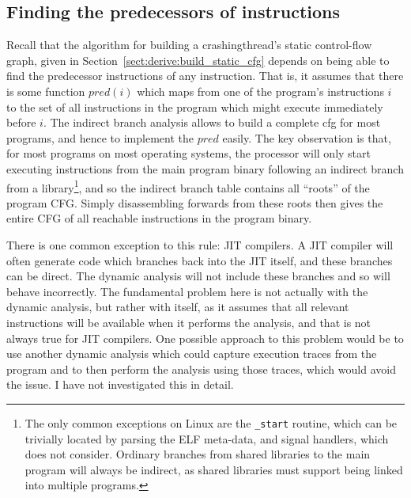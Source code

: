 \subsection{Finding the predecessors of instructions}
\label{sect:program_model:instr_predecessors}

Recall that the algorithm for building a \gls{crashingthread}'s static
control-flow graph, given in
Section~\ref{sect:derive:build_static_cfg} depends on being able to
find the predecessor instructions of any instruction.  That is, it
assumes that there is some function $\mathit{pred}(i)$ which maps from
one of the program's instructions $i$ to the set of all instructions
in the program which might execute immediately before $i$.  The
indirect branch analysis allows {\technique} to build a complete
\gls{cfg} for most programs, and hence to implement the
$\mathit{pred}$ easily.  The key observation is that, for most
programs on most operating systems, the processor will only start
executing instructions from the main program binary following an
indirect branch from a library\footnote{The only common exceptions on
  Linux are the \texttt{\_start} routine, which can be trivially
  located by parsing the ELF meta-data, and signal handlers, which
  {\technique} does not consider.  Ordinary branches from shared
  libraries to the main program will always be indirect, as shared
  libraries must support being linked into multiple programs.}, and so
the indirect branch table contains all ``roots'' of the program CFG.
Simply disassembling forwards from these roots then gives the entire
CFG of all reachable instructions in the program binary.

There is one common exception to this rule: JIT
compilers\cite{Adl-Tabatabai1998}.  A JIT compiler will often generate
code which branches back into the JIT itself, and these branches can
be direct.  The dynamic analysis will not
include these branches and so {\implementation} will behave
incorrectly.  The fundamental problem here is not actually with the
dynamic analysis, but rather with {\technique} itself, as it assumes
that all relevant instructions will be available when it performs the
analysis, and that is not always true for JIT compilers.  One possible
approach to this problem would be to use another dynamic analysis
which could capture execution traces from the program and to then
perform the analysis using those traces, which would avoid the issue.
I have not investigated this in detail.

